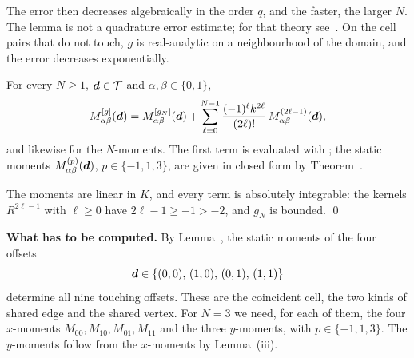 The error then decreases algebraically in the order $q$, and the faster, the larger $N$. The lemma is not a quadrature
error estimate; for that theory see~\cite{sauter2011boundary}. On the cell pairs that do not touch, $g$ is
real-analytic on a neighbourhood of the domain, and the \GL{} error decreases exponentially.

 For every $N\ge1$, $\vb*{d}\in\mathcal{T}$ and
$\alpha,\beta\in\{0,1\}$,
\begin{equation}
    \label{eq:decomposition}
    M^{[g]}_{\alpha\beta}(\vb*{d}) = M^{[g_N]}_{\alpha\beta}(\vb*{d})
        + \sum_{\ell=0}^{N-1}\frac{(-1)^\ell k^{2\ell}}{(2\ell)!}\,M^{(2\ell-1)}_{\alpha\beta}(\vb*{d}),
\end{equation}
and likewise for the $N$-moments. The first term is evaluated with \GL{}; the static moments $M^{(p)}_{\alpha\beta}(\vb*{d})$,
$p\in\{-1,1,3\}$, are given in closed form by Theorem~.

\vspace{\baselineskip}
\proof The moments are linear in $K$, and every term is absolutely integrable: the kernels $R^{2\ell-1}$ with $\ell\ge0$ have
$2\ell-1\ge-1>-2$, and $g_N$ is bounded. \qed

\vspace{\baselineskip}
\noindent\textbf{What has to be computed.} By Lemma~, the static moments of the four offsets
\begin{equation}
    \vb*{d}\in\{(0,0),\,(1,0),\,(0,1),\,(1,1)\}
\end{equation}
determine all nine touching offsets. These are the coincident cell, the two kinds of shared edge and the shared vertex.
For $N=3$ we need, for each of them, the four $x$-moments $M_{00},M_{10},M_{01},M_{11}$ and the three $y$-moments,
with $p\in\{-1,1,3\}$. The $y$-moments follow from the $x$-moments by Lemma~(iii).
